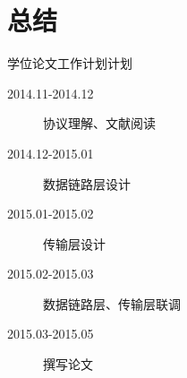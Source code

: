 \documentclass{beamer}
\begin{document}
\section{总结}

\begin{frame}{学位论文工作计划}{计划}
	\begin{description}
	\item[2014.11-2014.12] 协议理解、文献阅读
	\item[2014.12-2015.01] 数据链路层设计
	\item[2015.01-2015.02] 传输层设计
	\item[2015.02-2015.03] 数据链路层、传输层联调
	\item[2015.03-2015.05] 撰写论文
	\end{description}
\end{frame}
\end{document}
